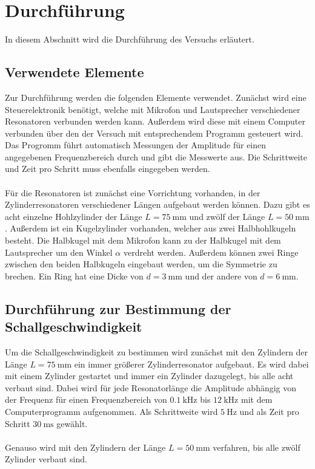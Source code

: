 %
%
\section{Durchführung}
\label{Durchführung}
In diesem Abschnitt wird die Durchführung des Versuchs erläutert. 
\subsection{Verwendete Elemente}
Zur Durchführung werden die folgenden Elemente verwendet. 
Zunächst wird eine Steuerelektronik benötigt, welche mit Mikrofon und Lautsprecher verschiedener Resonatoren verbunden werden kann. 
Außerdem wird diese mit einem Computer verbunden über den der Versuch mit entsprechendem Programm gesteuert wird.
Das Progromm führt automatisch Messungen der Amplitude für einen angegebenen Frequenzbereich durch und gibt die Messwerte aus. 
Die Schrittweite und Zeit pro Schritt muss ebenfalls eingegeben werden.
\\\\
%
Für die Resonatoren ist zunächst eine Vorrichtung vorhanden, in der Zylinderresonatoren verschiedener Längen aufgebaut werden können. 
Dazu gibt es acht einzelne Hohlzylinder der Länge $L=\qty{75}{\milli\meter}$ und zwölf der Länge $L= \qty{50}{\milli\meter}$.
Außerdem ist ein Kugelzylinder vorhanden, welcher aus zwei Halbhohlkugeln besteht. 
Die Halbkugel mit dem Mikrofon kann zu der Halbkugel mit dem Lautsprecher um den Winkel $\alpha$ verdreht werden. 
Außerdem können zwei Ringe zwischen den beiden Halbkugeln eingebaut werden, um die Symmetrie zu brechen. 
Ein Ring hat eine Dicke von $d=\qty{3}{\milli\meter}$ und der andere von $d= \qty{6}{\milli\meter}$.
%
%
%
%
%
\subsection{Durchführung zur Bestimmung der Schallgeschwindigkeit}
Um die Schallgeschwindigkeit zu bestimmen wird zunächst mit den Zylindern der Länge $L=\qty{75}{\milli\meter}$ ein immer größerer Zylinderresonator aufgebaut. 
Es wird dabei mit einem Zylinder gestartet und immer ein Zylinder dazugelegt, bis alle acht verbaut sind. 
Dabei wird für jede Resonatorlänge die Amplitude abhängig von der Frequenz für einen Frequenzbereich von $\qty{0.1}{\kilo\hertz}$ bis $\qty{12}{\kilo\hertz}$ mit dem Computerprogramm aufgenommen. 
Als Schrittweite wird $\qty{5}{\hertz}$ und als Zeit pro Schritt $\qty{30}{\milli\second}$ gewählt.
\\\\
Genauso wird mit den Zylindern der Länge $L=\qty{50}{\milli\meter}$ verfahren, bis alle zwölf Zylinder verbaut sind.
%
%
%
%
%

